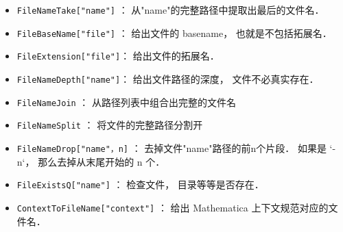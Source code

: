 
\begin{itemize}
\item \verb`FileNameTake["name"]` ： 从"name"的完整路径中提取出最后的文件名．
\item \verb`FileBaseName["file"]` ： 给出文件的 basename， 也就是不包括拓展名．
\item \verb`FileExtension["file"]`： 给出文件的拓展名．
\item \verb`FileNameDepth["name"]`： 给出文件路径的深度， 文件不必真实存在．
\end{itemize}


\begin{itemize}
\item \verb`FileNameJoin` ： 从路径列表中组合出完整的文件名
\item \verb`FileNameSplit` ： 将文件的完整路径分割开
\item \verb`FileNameDrop["name"，n]` ： 去掉文件"name"路径的前n个片段． 如果是 \ver`-n`， 那么去掉从末尾开始的 n 个．
\item \verb`FileExistsQ["name"]`  ： 检查文件， 目录等等是否存在．
\item \verb`ContextToFileName["context"]`  ： 给出 Mathematica 上下文规范对应的文件名．
\end{itemize}


